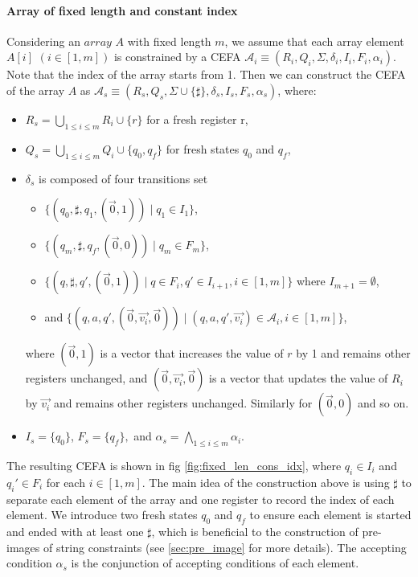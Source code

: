 \documentclass[12pt]{article}
\newcommand*{\aut}{\mathcal{A}}
\newcommand*{\myvec}[1]{\vec{#1}}
\newcommand{\arrconcat}{\sharp}
\newcommand{\myset}[1]{\{#1\}}
\theoremstyle{remark}
\begin{document}
\paragraph{Array of fixed length and constant index} Considering an $array$ $A$ with fixed length $m$, we assume that each array element $A[i]$ $(i\in[1,m])$ is constrained by a CEFA $\aut_i\equiv (R_i, Q_i, \Sigma, \delta_i, I_i, F_i, \alpha_i)$. Note that the index of the array starts from 1.  Then we can construct the CEFA of the array $A$ as $\aut_s\equiv (R_s, Q_s, \Sigma\cup\{\arrconcat\}, \delta_s, I_s, F_s, \alpha_s)$, where:
\begin{itemize}
    \item $R_s = \bigcup\limits_{1\leq i \leq m} R_i\cup \myset{r}$ for a fresh register r,
    \item $Q_s = \bigcup\limits_{1\leq i \leq m} Q_i\cup \myset{q_0, q_f}$ for fresh states $q_0$ and $q_f$,
    \item $\delta_s$ is composed of four transitions set
          \begin{itemize}
              \item  $\{(q_0, \arrconcat, q_1, (\myvec{0}, 1))\mid q_1\in I_1\}$,
              \item  $\myset{(q_m, \sharp, q_f, (\myvec{0}, 0))\mid q_m\in F_m}$,
              \item  $\{(q, \arrconcat, q', (\myvec{0}, 1)) \mid q\in F_i, q'\in I_{i+1}, i\in[1,m]\}$ where $ I_{m+1}=\emptyset$,
              \item  and $\{(q, a, q', (\myvec{0},\myvec{v_i},\myvec{0}))\mid (q, a, q', \myvec{v_i})\in \aut_i, i\in[1,m]\}$,
          \end{itemize}
          where $(\myvec{0}, 1)$ is a vector that increases the value of $r$ by 1 and remains other registers unchanged, and $(\myvec{0},\myvec{v_i},\myvec{0})$ is a vector that updates the value of $R_i$ by $\myvec{v_i}$ and remains other registers unchanged. Similarly for $(\myvec{0}, 0)$ and so on.
    \item $I_s = \myset{q_0}$, $F_s = \myset{q_f},$ and $\alpha_s = \bigwedge\limits_{1\leq i \leq m} \alpha_i$.
\end{itemize}
The resulting CEFA is shown in fig \ref{fig:fixed_len_cons_idx}, where $q_i\in I_i$ and $q_i'\in F_i$ for each $i\in [1,m]$. The main idea of the construction above is using $\arrconcat$ to separate each element of the array and one register to record the index of each element. We introduce two fresh states $q_0$ and $q_f$ to ensure each element is started and ended with at least one $\arrconcat $, which is beneficial to the construction of pre-images of string constraints (see \ref*{sec:pre_image} for more details). The accepting condition $\alpha_s$ is the conjunction of accepting conditions of each element.
\end{document}
